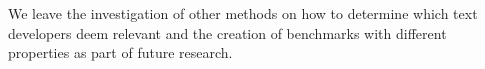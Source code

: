 





We leave the investigation of other methods on how to determine which text 
developers deem relevant 
and the creation of benchmarks with different properties
as part of future research.

















